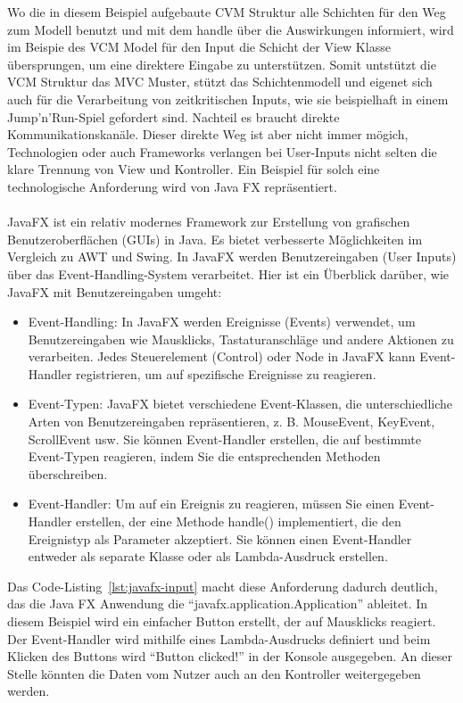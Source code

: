 Wo die in diesem Beispiel aufgebaute CVM Struktur alle Schichten für den Weg zum Modell benutzt und mit dem handle über die Auswirkungen informiert, wird im Beispie des VCM Model für den Input die Schicht der View Klasse übersprungen, um eine direktere Eingabe zu unterstützen. Somit untstützt die VCM Struktur das MVC Muster, stützt das Schichtenmodell und eigenet sich auch für die Verarbeitung von zeitkritischen Inputs, wie sie beispielhaft in einem Jump'n'Run-Spiel gefordert sind. Nachteil es braucht direkte Kommunikationskanäle. Dieser direkte Weg ist aber nicht immer mögich, Technologien oder auch Frameworks verlangen bei User-Inputs nicht selten die klare Trennung von View und Kontroller. Ein Beispiel für solch eine technologische Anforderung wird von Java FX repräsentiert.     
\\\\
JavaFX ist ein relativ modernes Framework zur Erstellung von grafischen Benutzeroberflächen (GUIs) in Java. Es bietet verbesserte Möglichkeiten im Vergleich zu AWT und Swing. In JavaFX werden Benutzereingaben (User Inputs) über das Event-Handling-System verarbeitet. Hier ist ein Überblick darüber, wie JavaFX mit Benutzereingaben umgeht:
\begin{itemize}
\item Event-Handling: In JavaFX werden Ereignisse (Events) verwendet, um Benutzereingaben wie Mausklicks, Tastaturanschläge und andere Aktionen zu verarbeiten. Jedes Steuerelement (Control) oder Node in JavaFX kann Event-Handler registrieren, um auf spezifische Ereignisse zu reagieren.
\item Event-Typen: JavaFX bietet verschiedene Event-Klassen, die unterschiedliche Arten von Benutzereingaben repräsentieren, z. B. MouseEvent, KeyEvent, ScrollEvent usw. Sie können Event-Handler erstellen, die auf bestimmte Event-Typen reagieren, indem Sie die entsprechenden Methoden überschreiben.
\item Event-Handler: Um auf ein Ereignis zu reagieren, müssen Sie einen Event-Handler erstellen, der eine Methode handle() implementiert, die den Ereignistyp als Parameter akzeptiert. Sie können einen Event-Handler entweder als separate Klasse oder als Lambda-Ausdruck erstellen.
 \end{itemize}   

Das Code-Listing~\ref{lst:javafx-input} macht diese Anforderung dadurch deutlich, das die Java FX Anwendung die \enquote{javafx.application.Application} ableitet. In diesem Beispiel wird ein einfacher Button erstellt, der auf Mausklicks reagiert. Der Event-Handler wird mithilfe eines Lambda-Ausdrucks definiert und beim Klicken des Buttons wird \enquote{Button clicked!} in der Konsole ausgegeben. An dieser Stelle könnten die Daten vom Nutzer auch an den Kontroller weitergegeben werden.

